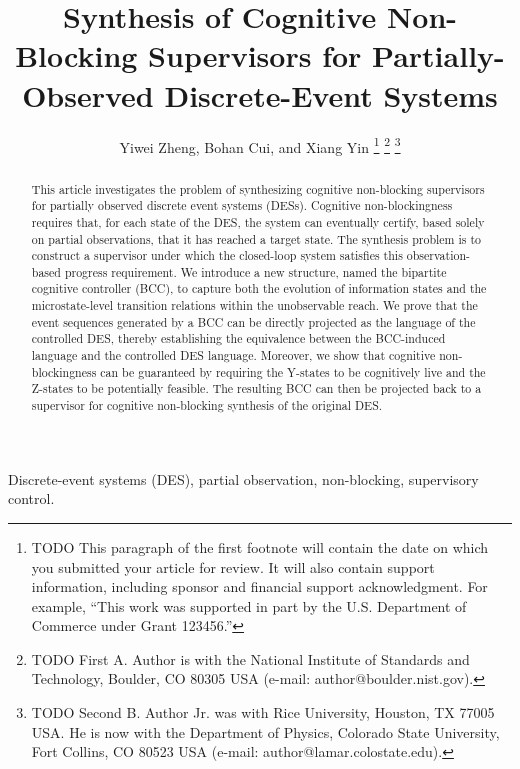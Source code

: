 \documentclass[journal,twoside,web]{ieeecolor}
\begin{document}
\title{Synthesis of Cognitive Non-Blocking Supervisors for Partially-Observed Discrete-Event Systems}
\author{Yiwei Zheng, Bohan Cui, and Xiang Yin
\thanks{TODO This paragraph of the first footnote will contain the date on which you submitted your article for review. It will also contain support information, including sponsor and financial support acknowledgment. 
For example, ``This work was supported in part by the U.S. Department of Commerce under Grant 123456.'' }
\thanks{TODO First A. Author is with the National Institute of Standards and 
Technology, Boulder, CO 80305 USA (e-mail: author@boulder.nist.gov). }
\thanks{TODO Second B. Author Jr. was with Rice University, Houston, TX 77005 USA. 
He is now with the Department of Physics, Colorado State University, Fort Collins, CO 80523 USA (e-mail: author@lamar.colostate.edu).}}

\maketitle

\begin{abstract}
This article investigates the problem of synthesizing cognitive non-blocking supervisors for partially observed discrete event systems (DESs).
Cognitive non-blockingness requires that, for each state of the DES, the system can eventually certify, based solely on partial observations, that it has reached a target state.
The synthesis problem is to construct a supervisor under which the closed-loop system satisfies this observation-based progress requirement.
%
We introduce a new structure, named the bipartite cognitive controller (BCC), to capture both the evolution of information states and the microstate-level transition relations within the unobservable reach.
We prove that the event sequences generated by a BCC can be directly projected as the language of the controlled DES, thereby establishing the equivalence between the BCC-induced language and the controlled DES language.
Moreover, we show that cognitive non-blockingness can be guaranteed by requiring the Y-states to be cognitively live and the Z-states to be potentially feasible.
The resulting BCC can then be projected back to a supervisor for cognitive non-blocking synthesis of the original DES.
\end{abstract}

\begin{IEEEkeywords}
Discrete-event systems (DES), partial observation, non-blocking, supervisory control. %
\end{IEEEkeywords}
\end{document}
